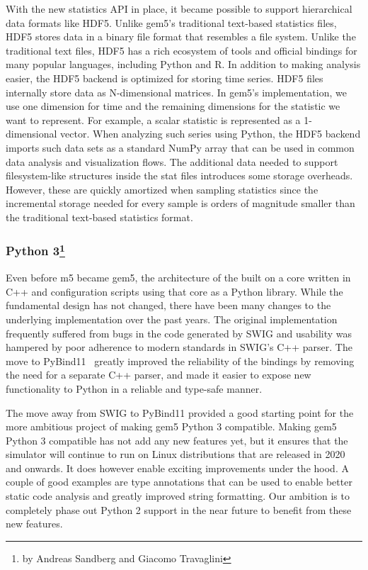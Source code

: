 With the new statistics API in place, it became possible to support hierarchical data formats like HDF5.
Unlike gem5's traditional text-based statistics files, HDF5 stores data in a binary file format that resembles a file system.
Unlike the traditional text files, HDF5 has a rich ecosystem of tools and official bindings for many popular languages, including Python and R.
 In addition to making analysis easier, the HDF5 backend is optimized for storing time series.
HDF5 files internally store data as N-dimensional matrices.
In gem5's implementation, we use one dimension for time and the remaining dimensions for the statistic we want to represent.
For example, a scalar statistic is represented as a 1-dimensional vector.
When analyzing such series using Python, the HDF5 backend imports such data sets as a standard NumPy array that can be used in common data analysis and visualization flows.
The additional data needed to support filesystem-like structures inside the stat files introduces some storage overheads.
However, these are quickly amortized when sampling statistics since the incremental storage needed for every sample is orders of magnitude smaller than the traditional text-based statistics format.

\subsubsection[Python 3]{Python 3\footnote{by Andreas Sandberg and Giacomo Travaglini}}

Even before m5 became gem5, the architecture of the built on a core written in C++ and configuration scripts using that core as a Python library.
While the fundamental design has not changed, there have been many changes to the underlying implementation over the past years.
The original implementation frequently suffered from bugs in the code generated by SWIG and usability was hampered by poor adherence to modern standards in SWIG's C++ parser.
The move to PyBind11~\cite{} greatly improved the reliability of the bindings by removing the need for a separate C++ parser, and made it easier to expose new functionality to Python in a reliable and type-safe manner.

The move away from SWIG to PyBind11 provided a good starting point for the more ambitious project of making gem5 Python 3 compatible.
Making gem5 Python 3 compatible has not add any new features yet, but it ensures that the simulator will continue to run on Linux distributions that are released in 2020 and onwards.
It does however enable exciting improvements under the hood.
A couple of good examples are type annotations that can be used to enable better static code analysis and greatly improved string formatting.
Our ambition is to completely phase out Python 2 support in the near future to benefit from these new features.

